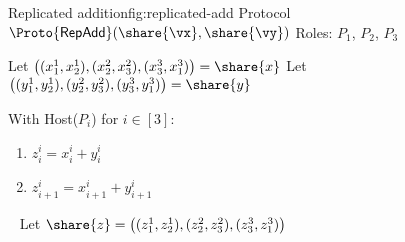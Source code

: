 \begin{Boxfig}{Replicated addition}{fig:replicated-add}
  {Protocol $\Proto{\mathsf{RepAdd}}(\share{\vx}, \share{\vy})$}
  Roles: $P_1$, $P_2$, $P_3$ \newline
  
  Let $\big((x_1^1, x_2^1), (x_2^2, x_3^2), (x_3^3, x_1^3) \big) = \share{x}$ \newline
  Let $\big((y_1^1, y_2^1), (y_2^2, y_3^2), (y_3^3, y_1^3) \big) = \share{y}$ \newline
  
  With Host($P_i$) for $i \in [3]$:
  \begin{enumerate}
    \item $z_i^i = x_i^i + y_i^i$
    \item $z_{i+1}^i = x_{i+1}^i + y_{i+1}^i$
  \end{enumerate}
  ~\newline
  Let $\share{z} = \big((z_1^1, z_2^1), (z_2^2, z_3^2), (z_3^3, z_1^3) \big)$
\end{Boxfig}









